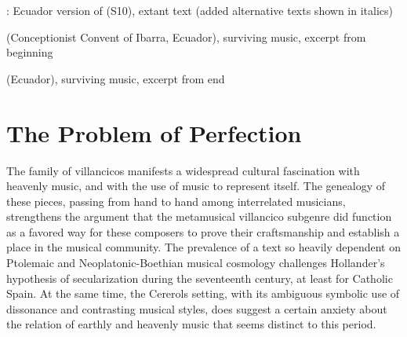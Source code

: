 

\begin{poemexample}
    \caption{: Ecuador version of
     (S10), extant text (added alternative texts
    shown in italics)}
    \label{poem:Suspended-Ecuador}
\end{poemexample}

\begin{musicexample}
    \caption{ (Conceptionist Convent of
    Ibarra, Ecuador), surviving music, excerpt from beginning}
    \label{mus:Suspended-Ecuador-1}
\end{musicexample}

\begin{musicexample}
    \caption{ (Ecuador), surviving music,
    excerpt from end}
    \label{mus:Suspended-Ecuador-2}
\end{musicexample}


\section{The Problem of Perfection}

The family of  villancicos manifests a widespread
cultural fascination with heavenly music, and with the use of music to
represent itself.
The genealogy of these pieces, passing from hand to hand among interrelated
musicians, strengthens the argument that the metamusical villancico subgenre did
function as a favored way for these composers to prove their craftsmanship and
establish a place in the musical community.
The prevalence of a text so heavily dependent on Ptolemaic and
Neoplatonic-Boethian musical cosmology challenges Hollander's hypothesis of
secularization during the seventeenth century, at least for Catholic Spain.
At the same time, the Cererols setting, with its ambiguous symbolic use of
dissonance and contrasting musical styles, does suggest a certain anxiety about
the relation of earthly and heavenly music that seems distinct to this period.

